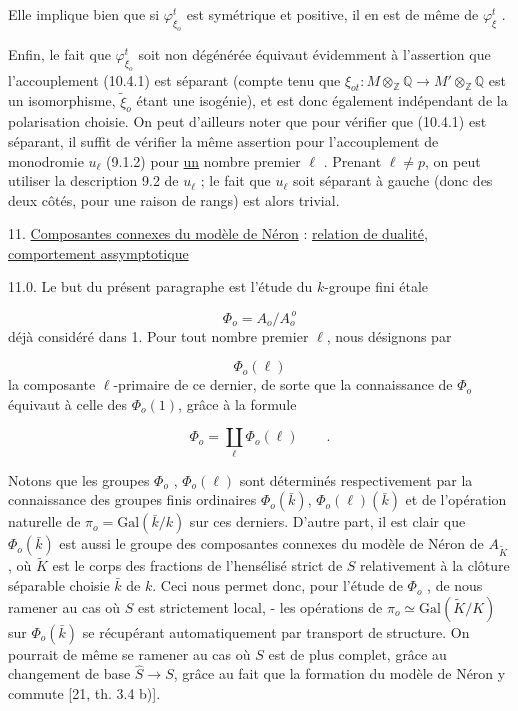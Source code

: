 
Elle implique bien que si $\varphi^t_{\xi_o}$ est symétrique et positive, il en est de même de $\varphi^t_{\xi}$ .

Enfin, le fait que $\varphi^t_{\xi_o}$ soit non dégénérée équivaut évidemment à l'assertion que l'accouplement (10.4.1) est séparant (compte tenu que $\xi_{ot} : M \otimes_{\mathbb{Z}} \mathbb{Q} \longrightarrow M' \otimes_{\mathbb{Z}} \mathbb{Q}$ est un isomorphisme, $\widetilde{\xi}_o$ étant une isogénie), et est donc également indépendant de la polarisation choisie. On peut d'ailleurs noter que pour vérifier que (10.4.1) est séparant, il suffit de vérifier la même assertion pour l'accouplement de monodromie $u_\ell$ (9.1.2) pour \underline{un} nombre premier $\ell$ . Prenant $\ell \neq p$, on peut utiliser la description 9.2 de $u_\ell$ ; le fait que $u_\ell$ soit séparant à gauche (donc des deux côtés, pour une raison de rangs) est alors trivial.


11. \underline{Composantes connexes du modèle de Néron} : \underline{relation de dualité, comportement assymptotique}

11.0.  Le but du présent paragraphe est l'étude du $k$-groupe fini étale

\begin{equation}\tag{11.0.1}
\Phi_o = A_o / A_o^{\,o}
\end{equation}
déjà considéré dans 1. Pour tout nombre premier $\ell$, nous désignons par

\begin{equation*}
\Phi_o(\ell)
\end{equation*}
la composante $\ell$-primaire de ce dernier, de sorte que la connaissance de $\Phi_o$ équivaut à celle des $\Phi_o(1)$, grâce à la formule

\begin{equation}\tag{11.0.2}
\Phi_o = \coprod_{\ell} \Phi_o(\ell) \qquad .
\end{equation}


Notons que les groupes $\Phi_{o}$ , $\Phi_{o}(\ell)$ sont déterminés respectivement par la connaissance des groupes finis ordinaires $\Phi_{o}(\bar{k})$, $\Phi_{o}(\ell)(\bar{k})$ et de l'opération naturelle de $\pi_{o} = \mathrm{Gal}(\bar{k}/k)$ sur ces derniers. D'autre part, il est clair que $\Phi_{o}(\bar{k})$ est aussi le groupe des composantes connexes du modèle de Néron de $A_{\widetilde{K}}$ , où $\widetilde{K}$ est le corps des fractions de l'hensélisé strict de $S$ relativement à la clôture séparable choisie $\bar{k}$ de $k$. Ceci nous permet donc, pour l'étude de $\Phi_{o}$ , de nous ramener au cas où $S$ est strictement local, - les opérations de $\pi_{o} \simeq \mathrm{Gal}(\widetilde{K}/K)$ sur $\Phi_{o}(\bar{k})$ se récupérant automatiquement par transport de structure. On pourrait de même se ramener au cas où $S$ est de plus complet, grâce au changement de base $\widehat{S} \longrightarrow S$, grâce au fait que la formation du modèle de Néron y commute [21, th. 3.4 b)].


